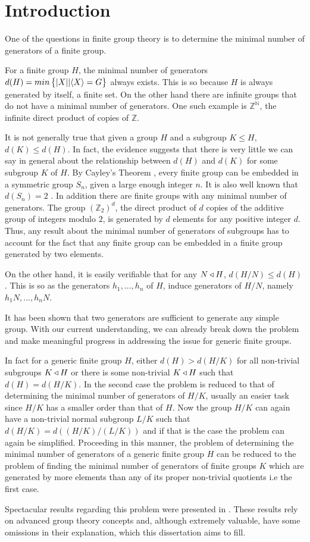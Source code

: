 \chapter*{Introduction}
One of the questions in finite group theory is to determine the minimal number of generators of a finite group.

For a finite group $H$, the minimal number of generators $d(H) = min\left\{| X ||\langle X \rangle = G \right\}$ always exists. This is so because $H$ is always generated by itself, a finite set. On the other hand there are infinite groups that do not have a minimal number of generators. One such example is $\mathbb{Z}^{\mathbb{N}}$, the infinite direct product of copies of $\mathbb{Z}$.

It is not generally true that given a group $H$ and a subgroup $K \le H$, $d(K) \le d(H)$. 
In fact, the evidence suggests that there is very little we can say in general about the relationship between $d(H)$ and $d(K)$ for some subgroup $K$ of $H$. By Cayley's Theorem \cite[p.~52]{RotmanITG}, every finite group can be embedded in a symmetric group $S_n$, given a large enough integer $n$. It is also well known that $d(S_n) = 2$ \cite[p.~24]{RotmanITG}. In addition there are finite groups with any minimal number of generators. The group $(\mathbb{Z}_2)^d$, the direct product of $d$ copies of the additive group of integers modulo $2$, is generated by $d$ elements for any positive integer $d$. Thus, any result about the minimal number of generators of subgroups has to account for the fact that any finite group can be embedded in a finite group generated by two elements.

On the other hand, it is easily verifiable that for any $N \triangleleft H$, $d(H/N) \le d(H)$. 
This is so as the generators $h_1,...,h_n$ of $H$, induce generators of $H/N$, namely $h_1N, ..., h_nN$.


It has been shown \cite{AschbacherSAFCG} that two generators are sufficient to generate any simple group.
With our current understanding, we can already break down the problem and make meaningful progress in addressing the issue for generic finite groups.

In fact for a generic finite group $H$, either $d(H) > d(H/K)$ for all non-trivial subgroups $K \triangleleft H$ or there is some non-trivial $K \triangleleft H$ such that $d(H) = d(H/K)$. In the second case the problem is reduced to that of determining the minimal number of generators of $H/K$, usually an easier task since $H/K$ has a smaller order than that of $H$. Now the group $H/K$ can again have a non-trivial normal subgroup $L/K$ such that $d(H/K) = d((H/K)/(L/K))$ and if that is the case the problem can again be simplified. Proceeding in this manner, the problem of determining the minimal number of generators of a generic finite group $H$ can be reduced to the problem of finding the minimal number of generators of finite groups $K$ which are generated by more elements than any of its proper non-trivial quotients i.e the first case.

Spectacular results regarding this problem were presented in \cite{DallaVoltaFGNMGAPQ}. These results rely on advanced group theory concepts and, although extremely valuable, have some omissions in their explanation, which this dissertation aims to fill.
